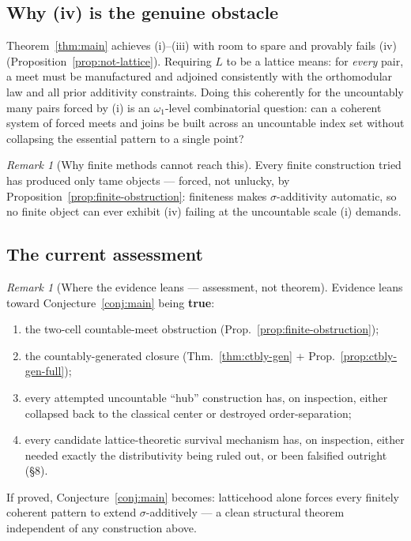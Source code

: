 \documentclass[11pt]{article}
\theoremstyle{remark}
\newtheorem{remark}[theorem]{Remark}
\begin{document}
\subsection{Why (iv) is the genuine obstacle}

Theorem~\ref{thm:main} achieves (i)--(iii) with room to spare and provably
fails (iv) (Proposition~\ref{prop:not-lattice}). Requiring $L$ to be a lattice
means: for \emph{every} pair, a meet must be manufactured and adjoined
consistently with the orthomodular law and all prior additivity constraints.
Doing this coherently for the uncountably many pairs forced by (i) is an
$\omega_1$-level combinatorial question: can a coherent system of forced
meets and joins be built across an uncountable index set without collapsing
the essential pattern to a single point?

\begin{remark}[Why finite methods cannot reach this]
\label{rem:finite-methods}
Every finite construction tried has produced only tame objects — forced, not
unlucky, by Proposition~\ref{prop:finite-obstruction}: finiteness makes
$\sigma$-additivity automatic, so no finite object can ever exhibit (iv)
failing at the uncountable scale (i) demands.
\end{remark}

\subsection{The current assessment}

\begin{remark}[Where the evidence leans — assessment, not theorem]
\label{rem:assessment}
Evidence leans toward Conjecture~\ref{conj:main} being \textbf{true}:
\begin{enumerate}[label=(\alph*)]
\item the two-cell countable-meet obstruction (Prop.~\ref{prop:finite-obstruction});
\item the countably-generated closure (Thm.~\ref{thm:ctbly-gen} + Prop.~\ref{prop:ctbly-gen-full});
\item every attempted uncountable ``hub'' construction has, on inspection,
  either collapsed back to the classical center or destroyed
  order-separation;
\item every candidate lattice-theoretic survival mechanism has, on
  inspection, either needed exactly the distributivity being ruled out, or
  been falsified outright (\S8).
\end{enumerate}
If proved, Conjecture~\ref{conj:main} becomes: latticehood alone forces every
finitely coherent pattern to extend $\sigma$-additively — a clean structural
theorem independent of any construction above.
\end{remark}
\end{document}
